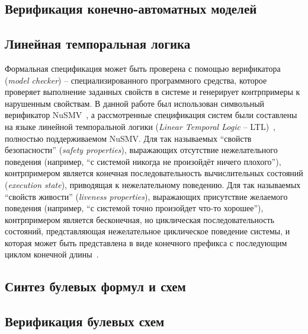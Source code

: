 \subsection{Верификация конечно-автоматных моделей}
\label{sub:automata-verification}

\subsection{Линейная темпоральная логика}%
\label{sub:ltl}


Формальная спецификация может быть проверена с помощью верификатора (\emph{model checker}) \--- специализированного программного средства, которое проверяет выполнение заданных свойств в системе и генерирует контрпримеры к нарушенным свойствам.
В данной работе был использован символьный верификатор NuSMV~\cite{NuSMV}, а рассмотренные спецификация систем были составлены на языке линейной темпоральной логики (\textit{Linear Temporal Logic} \--- LTL)~\cite{ltl}, полностью поддерживаемом NuSMV\@.
Для так называемых \enquote{свойств безопасности} (\textit{safety properties}), выражающих отсутствие нежелательного поведения (например, \enquote{с системой никогда не произойдёт ничего плохого}), контрпримером является конечная последовательность вычислительных состояний (\textit{execution state}), приводящая к нежелательному поведению.
Для так называемых \enquote{свойств живости} (\textit{liveness properties}), выражающих присутствие желаемого поведения (например, \enquote{с системой точно произойдет что-то хорошее}), контрпримером является бесконечная, но циклическая последовательность состояний, представляющая нежелательное циклическое поведение системы, и которая может быть представлена в виде конечного префикса с последующим циклом конечной длины~\cite{clarke1999model}.



\subsection{Синтез булевых формул и схем}
\label{sub:circuits-synthesis}


\subsection{Верификация булевых схем}
\label{sub:circuits-verification}

